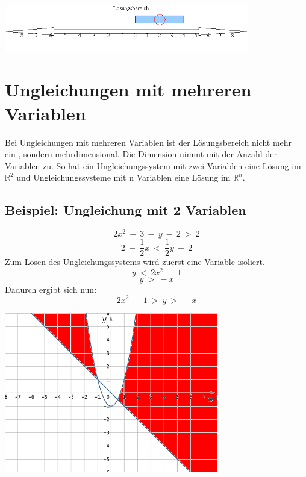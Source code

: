 \begin{center}
\includegraphics[width=0.8\textwidth]{img/LBer3.png}
\end{center}

\section{Ungleichungen mit mehreren Variablen}

Bei Ungleichungen mit mehreren Variablen ist der Lösungsbereich nicht mehr ein-, sondern mehrdimensional. Die Dimension nimmt mit der Anzahl der Variablen zu. So hat ein Ungleichungssystem mit zwei Variablen eine Lösung im $ \mathbb{R}^2 $ und Ungleichungssysteme mit n Variablen eine Lösung im $ \mathbb{R}^n $.

\subsection{Beispiel: Ungleichung mit 2 Variablen}

\[ 2x^2 \ + \ 3 \ - \ y \ - \ 2 \ > \ 2 \]
\[ 2 \ - \ \frac 1 2 x \ < \ \frac 1 2 y \ + \ 2\]
Zum Lösen des Ungleichungssystems wird zuerst eine Variable isoliert.
\[ y \ < \ 2x^2 \ - \ 1 \]
\[ y \ > \ -x\]
Dadurch ergibt sich nun:
\[ 2x^2 \ - \ 1 \ > \ y \ > \ -x \]

{}
\begin{center}
\includegraphics[width=0.7\textwidth]{img/UGlsystmit2.png}
\end{center}

